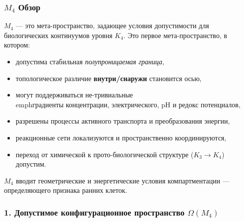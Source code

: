 

\subsubsection{\texorpdfstring{$M_4$}{M_4} Обзор}
\label{sec:m4-overview}

$M_4$ — это мета-пространство, задающее условия допустимости для
биологических континуумов уровня $K_4$.
Это первое мета-пространство, в котором:

\begin{itemize}
    \item допустима стабильная \emph{полупроницаемая граница},
    \item топологическое различие \textbf{внутри/снаружи} становится осью,
    \item могут поддерживаться не-тривиальные \\emph{градиенты концентрации, электрического,
    pH и редокс потенциалов},
    \item разрешены процессы активного транспорта и преобразования энергии,
    \item реакционные сети локализуются и пространственно координируются,
    \item переход от химической к прото-биологической структуре ($K_3 \to K_4$)
          допустим.
\end{itemize}

$M_4$ вводит геометрические и энергетические условия
компартментации — определяющего признака ранних клеток.

\subsubsection*{1. Допустимое конфигурационное пространство \texorpdfstring{$\Omega(M_4)$}{\Omega(M_4)}}

